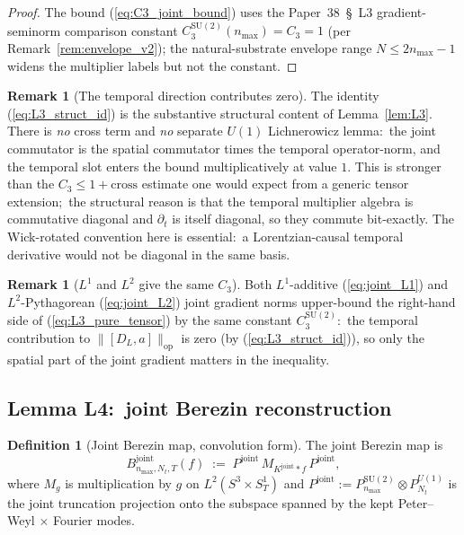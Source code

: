 \documentclass[11pt,a4paper]{article}
\theoremstyle{plain}
\theoremstyle{definition}
\newtheorem{definition}[theorem]{Definition}
\newtheorem{remark}[theorem]{Remark}
\newcommand{\nmax}{n_{\max}}
\newcommand{\Nt}{N_{t}}
\newcommand{\Manifold}{S^{3}\times S^{1}_{T}}
\newcommand{\opnorm}[1]{\lVert #1 \rVert_{\mathrm{op}}}
\newcommand{\SU}{\mathrm{SU}}
\newcommand{\Uone}{U(1)}
\newcommand{\DL}{D_{L}}
\newcommand{\Bjoint}{B^{\mathrm{joint}}}
\newcommand{\Pjoint}{P^{\mathrm{joint}}}
\newcommand{\Kjoint}{K^{\mathrm{joint}}}
\newcommand{\CthreeSU}{C_{3}^{\SU(2)}}
\begin{document}
\begin{proof}
The bound (\ref{eq:C3_joint_bound}) uses the Paper~38~\S~L3
gradient-seminorm comparison constant $\CthreeSU(\nmax) = C_{3} = 1$ (per
Remark~\ref{rem:envelope_v2}); the natural-substrate envelope range
$N \le 2\nmax - 1$ widens the multiplier labels but not the constant. \qedhere
\end{proof}

\begin{remark}[The temporal direction contributes zero]\label{rem:no_cross}
The identity (\ref{eq:L3_struct_id}) is the substantive structural
content of Lemma~\ref{lem:L3}. There is \emph{no} cross term and
\emph{no} separate $\Uone$ Lichnerowicz lemma:\ the joint commutator
is the spatial commutator times the temporal operator-norm, and the
temporal slot enters the bound multiplicatively at value $1$. This is
stronger than the $C_{3} \le 1 + \mathrm{cross}$ estimate one would
expect from a generic tensor extension;\ the structural reason is that
the temporal multiplier algebra is commutative diagonal and
$\partial_{t}$ is itself diagonal, so they commute bit-exactly. The
Wick-rotated convention here is essential:\ a Lorentzian-causal
temporal derivative would not be diagonal in the same basis.
\end{remark}

\begin{remark}[$L^{1}$ and $L^{2}$ give the same $C_{3}$]\label{rem:L1_L2_equal}
Both $L^{1}$-additive (\ref{eq:joint_L1}) and $L^{2}$-Pythagorean
(\ref{eq:joint_L2}) joint gradient norms upper-bound the right-hand
side of (\ref{eq:L3_pure_tensor}) by the same constant $\CthreeSU$:\
the temporal contribution to $\opnorm{[\DL, a]}$ is zero (by
(\ref{eq:L3_struct_id})), so only the spatial part of the joint
gradient matters in the inequality.
\end{remark}

\subsection{Lemma L4:\ joint Berezin reconstruction}
\label{sec:L4}

\begin{definition}[Joint Berezin map, convolution form]
\label{def:joint_berezin}
The joint Berezin map is
\begin{equation}\label{eq:joint_berezin}
   \Bjoint_{\nmax,\Nt,T}(f) \;:=\; \Pjoint\,M_{\Kjoint \ast f}\,\Pjoint,
\end{equation}
where $M_{g}$ is multiplication by $g$ on $L^{2}(\Manifold)$ and
$\Pjoint := P^{\SU(2)}_{\nmax} \otimes P^{\Uone}_{\Nt}$ is the joint
truncation projection onto the subspace spanned by the kept
Peter--Weyl $\times$ Fourier modes.
\end{definition}
\end{document}
